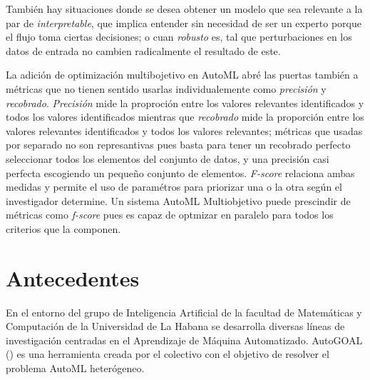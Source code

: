 Tambi\'en hay situaciones donde se desea obtener un modelo que sea relevante a la par de \textit{interpretable}, que implica entender sin necesidad de ser un experto porque el flujo toma ciertas decisiones; o cuan \textit{robusto} es, tal que perturbaciones en los datos de entrada no cambien radicalmente el resultado de este.

La adici\'on de optimizaci\'on multibojetivo en AutoML abr\'e las puertas tambi\'en a m\'etricas que no tienen sentido usarlas individualemente como \textit{precisi\'on} y \textit{recobrado}. 
 \textit{Precisi\'on} mide la proproci\'on entre los valores relevantes identificados y todos los valores identificados
 mientras que \textit{recobrado} mide la proporci\'on entre los valores relevantes identificados y todos los valores relevantes;
m\'etricas que usadas por separado no son represantivas pues basta para tener un recobrado perfecto seleccionar todos los elementos del conjunto de datos, y una precisi\'on casi perfecta escogiendo un pequeño conjunto de elementos.
\textit{F-score} relaciona ambas medidas y permite el uso de  param\'etros para priorizar una o la otra seg\'un el investigador determine. 
Un sistema AutoML Multiobjetivo puede prescindir de m\'etricas como \textit{f-score} pues es capaz de optmizar en paralelo para todos los criterios que la componen.


\section*{Antecedentes}

En el entorno del grupo de Inteligencia Artificial de la facultad de Matem\'aticas y Computaci\'on de la Universidad de La Habana se desarrolla diversas l\'ineas de investigaci\'on centradas en el Aprendizaje de M\'aquina Automatizado. AutoGOAL (\cite{estevez2020solving}) es una herramienta creada por el colectivo con el objetivo de resolver el problema AutoML heter\'ogeneo.

